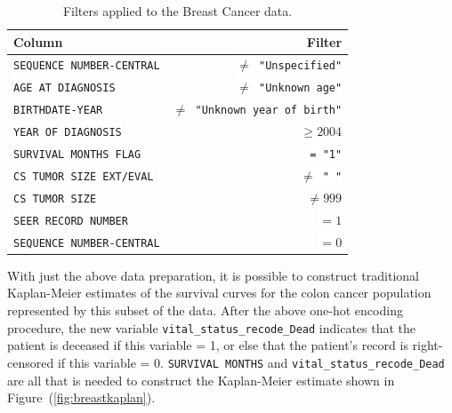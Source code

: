\documentclass[a4paper,11pt]{article}
\newcommand{\codewhite}[1]{\colorbox{white}{\texttt{#1}}}
\begin{document}
\begin{table}[tbp]
\begin{center}
\begin{tabular}{lr}
\toprule
 Column &  Filter \\
\midrule
\codewhite{SEQUENCE NUMBER-CENTRAL} & \codewhite{$\neq$ "Unspecified"} \\
\codewhite{AGE AT DIAGNOSIS} & \codewhite{$\neq$ "Unknown age"} \\
\codewhite{BIRTHDATE-YEAR} & \codewhite{$\neq$ "Unknown year of birth"} \\
\codewhite{YEAR OF DIAGNOSIS} & \codewhite{$\geq 2004$} \\
\codewhite{SURVIVAL MONTHS FLAG} & \codewhite{= "1"}\\
\codewhite{CS TUMOR SIZE EXT/EVAL} & \codewhite{$\neq$ " "} \\
\codewhite{CS TUMOR SIZE} & \codewhite{$\neq 999$} \\
\codewhite{SEER RECORD NUMBER} & \codewhite{$= 1$} \\
\codewhite{SEQUENCE NUMBER-CENTRAL} & \codewhite{$=0$} \\
\bottomrule
\end{tabular}
\caption{\label{tab:breastfilter} Filters applied to the Breast Cancer data.}
\end{center}
\end{table}




With just the above data preparation, it is possible to construct traditional Kaplan-Meier estimates of the survival curves for the colon cancer population represented by this subset of the data.
After the above one-hot encoding procedure, the new variable
\codewhite{vital\_status\_recode\_Dead} indicates that the patient is deceased if this variable = 1, or else that the patient's record is right-censored if this variable = 0.
\codewhite{SURVIVAL MONTHS} and \codewhite{vital\_status\_recode\_Dead} are all that is needed to construct the Kaplan-Meier estimate shown in Figure~(\ref{fig:breastkaplan}).
\end{document}
